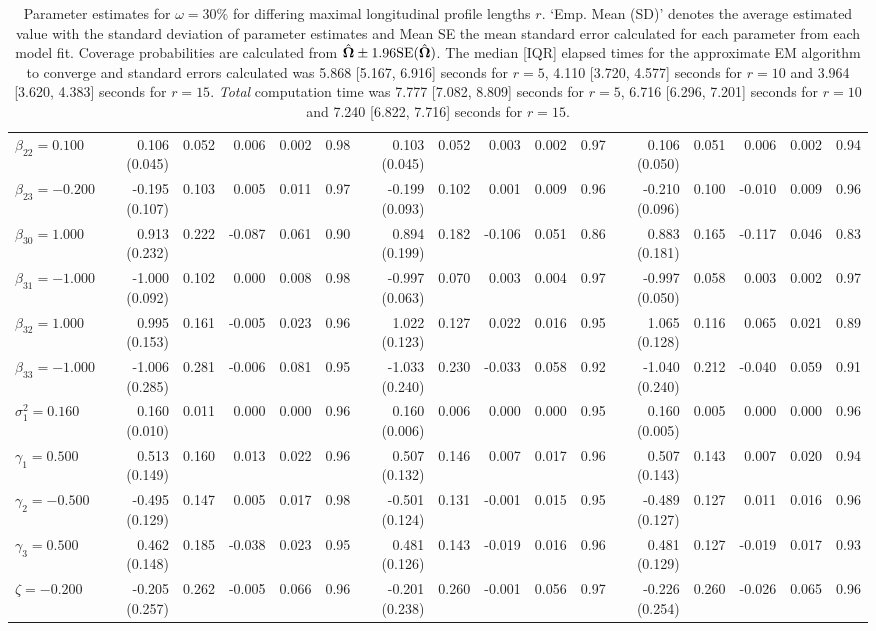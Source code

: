 \begin{landscape}
\begin{table}[ht]
\begin{tabular}{l|rrrrr:rrrrr:rrrrr}
  $\beta_{22}= 0.100$ &  0.106 (0.045) & 0.052 &  0.006 & 0.002 & 0.98 &  0.103 (0.045) & 0.052 &  0.003 & 0.002 & 0.97 &  0.106 (0.050) & 0.051 &  0.006 & 0.002 & 0.94 \\ 
  $\beta_{23}=-0.200$ & -0.195 (0.107) & 0.103 &  0.005 & 0.011 & 0.97 & -0.199 (0.093) & 0.102 &  0.001 & 0.009 & 0.96 & -0.210 (0.096) & 0.100 & -0.010 & 0.009 & 0.96 \\ 
  $\beta_{30}= 1.000$ &  0.913 (0.232) & 0.222 & -0.087 & 0.061 & 0.90 &  0.894 (0.199) & 0.182 & -0.106 & 0.051 & 0.86 &  0.883 (0.181) & 0.165 & -0.117 & 0.046 & 0.83 \\ 
  $\beta_{31}=-1.000$ & -1.000 (0.092) & 0.102 &  0.000 & 0.008 & 0.98 & -0.997 (0.063) & 0.070 &  0.003 & 0.004 & 0.97 & -0.997 (0.050) & 0.058 &  0.003 & 0.002 & 0.97 \\ 
  $\beta_{32}= 1.000$ &  0.995 (0.153) & 0.161 & -0.005 & 0.023 & 0.96 &  1.022 (0.123) & 0.127 &  0.022 & 0.016 & 0.95 &  1.065 (0.128) & 0.116 &  0.065 & 0.021 & 0.89 \\ 
  $\beta_{33}=-1.000$ & -1.006 (0.285) & 0.281 & -0.006 & 0.081 & 0.95 & -1.033 (0.240) & 0.230 & -0.033 & 0.058 & 0.92 & -1.040 (0.240) & 0.212 & -0.040 & 0.059 & 0.91 \\ 
  $\sigma^2_1= 0.160$ &  0.160 (0.010) & 0.011 &  0.000 & 0.000 & 0.96 &  0.160 (0.006) & 0.006 &  0.000 & 0.000 & 0.95 &  0.160 (0.005) & 0.005 &  0.000 & 0.000 & 0.96 \\ 
  $\gamma_1= 0.500$ &  0.513 (0.149) & 0.160 &  0.013 & 0.022 & 0.96 &  0.507 (0.132) & 0.146 &  0.007 & 0.017 & 0.96 &  0.507 (0.143) & 0.143 &  0.007 & 0.020 & 0.94 \\ 
  $\gamma_2=-0.500$ & -0.495 (0.129) & 0.147 &  0.005 & 0.017 & 0.98 & -0.501 (0.124) & 0.131 & -0.001 & 0.015 & 0.95 & -0.489 (0.127) & 0.127 &  0.011 & 0.016 & 0.96 \\ 
  $\gamma_3= 0.500$ &  0.462 (0.148) & 0.185 & -0.038 & 0.023 & 0.95 &  0.481 (0.126) & 0.143 & -0.019 & 0.016 & 0.96 &  0.481 (0.129) & 0.127 & -0.019 & 0.017 & 0.93 \\ 
  $\zeta=-0.200$ & -0.205 (0.257) & 0.262 & -0.005 & 0.066 & 0.96 & -0.201 (0.238) & 0.260 & -0.001 & 0.056 & 0.97 & -0.226 (0.254) & 0.260 & -0.026 & 0.065 & 0.96 \\ 
   \hline
\end{tabular}
\endgroup
\caption{Parameter estimates for $\omega=30\%$ for differing maximal longitudinal profile lengths $r$. `Emp. Mean (SD)' denotes the average estimated value with the standard deviation of parameter estimates and Mean SE the mean standard error calculated for each parameter from each model fit. Coverage probabilities are calculated from $\hat{\bm{\Omega}}\pm1.96\mathrm{SE}(\hat{\bm{\Omega}})$. The median [IQR] elapsed times for the approximate EM algorithm to converge and standard errors calculated was 5.868 [5.167, 6.916] seconds for $r=5$, 4.110 [3.720, 4.577] seconds for $r=10$ and 3.964 [3.620, 4.383] seconds for $r=15$. \textit{Total} computation time was 7.777 [7.082, 8.809] seconds for $r=5$, 6.716 [6.296, 7.201] seconds for $r=10$ and 7.240 [6.822, 7.716] seconds for $r=15$.} 

\end{table}
\end{landscape}
